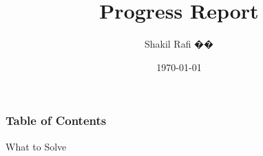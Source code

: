 \documentclass{beamer}
\title[Short title]{Progress Report}
\author{Shakil Rafi ��}
\institute[University of Arkansas] 
{
University of Arkansas \\ 
\medskip
}
\date{\today}
\begin{document}
\nocite{*}
\begin{frame}
\titlepage 
\end{frame}

\begin{frame}
\frametitle{Table of Contents} 
    \tableofcontents 
\end{frame}
\begin{frame}{What to Solve}
    
\end{frame}
\end{document}
